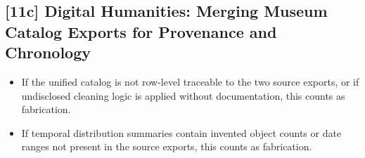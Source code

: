 \subsection{[11c] Digital Humanities: Merging Museum Catalog Exports for Provenance and Chronology}

\begin{itemize}
  \item If the unified catalog is not row-level traceable to the two source
        exports, or if undisclosed cleaning logic is applied without
        documentation, this counts as fabrication.
  \item If temporal distribution summaries contain invented object counts or
        date ranges not present in the source exports, this counts as
        fabrication.
\end{itemize}